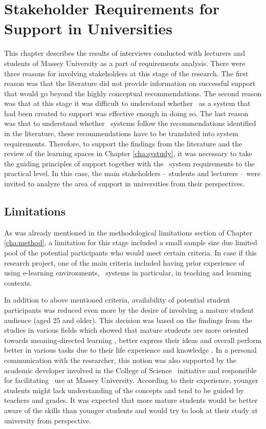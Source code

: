 \chapter{Stakeholder Requirements for \LLLc Support in Universities
\label{cha:model}}
This chapter describes the results of interviews conducted with lecturers and
students of Massey University as a part of \LLLs requirements analysis. There
were three reasons for involving stakeholders at this stage of the research. The
first reason was that the literature did not provide information on successful
\LLLs support that would go beyond the highly conceptual recommendations. The
second reason was that at this stage it was difficult to understand whether
\ep~as a system that had been created to support \LLLs was effective enough in
doing so. The last reason was that to understand whether \ep~systems follow the
recommendations identified in the literature, these recommendations have to be
translated into system requirements. Therefore, to support the findings from the
literature and the review of the learning spaces in Chapter \ref{cha:systudy},
it was necessary to take the guiding principles of \LLLs support together with
the \ep~system requirements to the practical level. In this case, the main
stakeholders -- students and lecturers -- were invited to analyze the area of
\LLLs support in universities from their perspectives.

\section{Limitations}

As was already mentioned in the methodological limitations section of Chapter
\ref{cha:method}, a limitation for this stage included a small sample size due
limited pool of the potential participants who would meet certain criteria. In
case if this research project, one of the main criteria included having prior
experience of using e-learning environments, \ep~systems in particular, in
teaching and learning contexts.

In addition to above mentioned criteria, availability of potential student
participants was reduced even more by the desire of involving a mature student
audience (aged 25 and older). This decision was based on the findings from the
studies in various fields which showed that mature students are more oriented
towards meaning-directed learning \citep{Smith2010}, better express their ideas
\citep{Lea2010} and overall perform better in various tasks due to their life
experience and knowledge \citep{Sherwood1987}. In a personal communication with
the researcher, this notion was also supported by the academic developer
involved in the College of Science \ep~initiative and responsible for
facilitating \ep~use at Massey University. According to their experience,
younger students might lack understanding of the \LLLs concepts and tend to be
guided by teachers and grades. It was expected that more mature students would
be better aware of the \LLLs skills than younger students and would try to look
at their study at university from \LLLs perspective.

